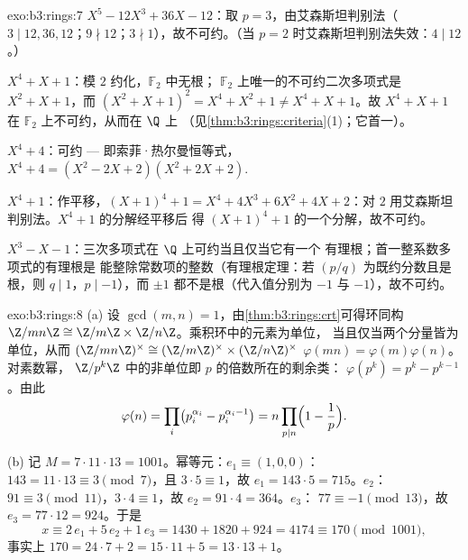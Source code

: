\begin{solution}{exo:b3:rings:7}
\emph{$X^5 - 12X^3 + 36X - 12$}：取 $p = 3$，由艾森斯坦判别法（$3 \mid
12, 36, 12$；$9 \nmid 12$；$3 \nmid 1$），故不可约。（当 $p = 2$
时艾森斯坦判别法失效：$4 \mid 12$。）

\emph{$X^4 + X + 1$}：模 $2$ 约化，$\mathbb F_2$ 中无根；
$\mathbb F_2$ 上唯一的不可约二次多项式是 $X^2 + X +
1$，而 $(X^2+X+1)^2 = X^4 + X^2 + 1 \neq X^4 + X + 1$。故 $X^4 +
X + 1$ 在 $\mathbb F_2$ 上不可约，从而在 $\Q$ 上
（见\cref{thm:b3:rings:criteria}(1)；它首一）。

\emph{$X^4 + 4$}：可约 --- 即索菲·热尔曼恒等式，
$X^4 + 4 = (X^2 - 2X + 2)(X^2 + 2X + 2)$.

\emph{$X^4 + 1$}：作平移，$(X+1)^4 + 1 = X^4 + 4X^3 + 6X^2 + 4X +
2$：对 $2$ 用艾森斯坦判别法。$X^4+1$ 的分解经平移后
得 $(X+1)^4 + 1$ 的一个分解，故不可约。

\emph{$X^3 - X - 1$}：三次多项式在 $\Q$ 上可约当且仅当它有一个
有理根；首一整系数多项式的有理根是
能整除常数项的整数（有理根定理：若
$(p/q)$ 为既约分数且是根，则 $q \mid 1$，$p \mid -1$），而
$\pm 1$ 都不是根（代入值分别为 $-1$ 与 $-1$），故不可约。
\end{solution}

\begin{solution}{exo:b3:rings:8}
(a) 设 $\gcd(m, n) = 1$，由\cref{thm:b3:rings:crt}可得环同构
$\Z/mn\Z \cong \Z/m\Z \times \Z/n\Z$。乘积环中的元素为单位，
当且仅当两个分量皆为单位，从而
$(\Z/mn\Z)^\times \cong (\Z/m\Z)^\times \times (\Z/n\Z)^\times$
$\varphi(mn) = \varphi(m)\varphi(n)$。对素数幂，
$\Z/p^k\Z$ 中的非单位即 $p$ 的倍数所在的剩余类：
$\varphi(p^k) = p^k - p^{k-1}$。由此
\[
\varphi(n) = \prod_i \bigl(p_i^{\alpha_i} -
p_i^{\alpha_i-1}\bigr) = n \prod_{p \mid n}\Bigl(1 -
\frac1p\Bigr).
\]

(b) 记 $M = 7 \cdot 11 \cdot 13 = 1001$。幂等元：$e_1 \equiv
(1, 0, 0)$：$143 = 11\cdot13 \equiv 3 \pmod 7$，且 $3 \cdot 5
\equiv 1$，故 $e_1 = 143 \cdot 5 = 715$。$e_2$：$91 \equiv 3
\pmod{11}$，$3 \cdot 4 \equiv 1$，故 $e_2 = 91\cdot4 = 364$。$e_3$：
$77 \equiv -1 \pmod{13}$，故 $e_3 = 77 \cdot 12 = 924$。于是
\[
x \equiv 2\,e_1 + 5\,e_2 + 1\,e_3 = 1430 + 1820 + 924 = 4174
\equiv 170 \pmod{1001},
\]
事实上 $170 = 24\cdot7 + 2 = 15\cdot11 + 5 = 13\cdot13 + 1$。
\end{solution}

